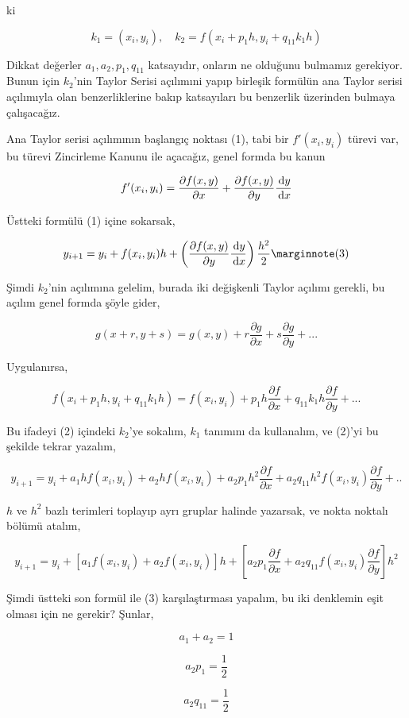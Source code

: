 \documentclass[12pt,fleqn]{article}\usepackage{../../common}
\begin{document}
ki

$$
k_1 = (x_i,y_i), \quad k_2 = f(x_i+p_1 h, y_i + q_{11}k_1h)
$$

Dikkat değerler $a_1,a_2,p_1,q_{11}$ katsayıdır, onların ne olduğunu bulmamız
gerekiyor. Bunun için $k_2$'nin Taylor Serisi açılımıni yapıp birleşik formülün
ana Taylor serisi açılımıyla olan benzerliklerine bakıp katsayıları bu benzerlik
üzerinden bulmaya çalışacağız.

Ana Taylor serisi açılımının başlangıç noktası (1), tabi bir $f'(x_i,y_i)$
türevi var, bu türevi Zincirleme Kanunu ile açacağız, genel formda bu kanun

$$
f'(x_i,y_i) = \frac{\partial f(x,y)}{\partial x} +
\frac{\partial f(x,y)}{\partial y} \frac{\,\mathrm{d} y}{\,\mathrm{d} x}
$$

Üstteki formülü (1) içine sokarsak,

$$
y_{i+1} = y_i + f(x_i,y_i) h +
\left( \frac{\partial f(x,y)}{\partial y} \frac{\ud y}{\ud x}  \right) \frac{h^2}{2}
\mlabel{3}
$$

Şimdi $k_2$'nin açılımına gelelim, burada iki değişkenli Taylor açılımı gerekli,
bu açılım genel formda şöyle gider,

$$
g(x+r,y+s) = g(x,y) + r \frac{\partial g}{\partial x} + s \frac{\partial g}{\partial y} + ...
$$

Uygulanırsa,

$$
f(x_i+p_1 h, y_i + q_{11}k_1h) = f(x_i,y_i) +
p_1 h \frac{\partial f}{\partial x} +
q_{11} k_1 h \frac{\partial f}{\partial y} + ...
$$

Bu ifadeyi (2) içindeki $k_2$'ye sokalım, $k_1$ tanımını da kullanalım, ve
(2)'yi bu şekilde tekrar yazalım,

$$
y_{i+1} = y_i + a_1 h f(x_i,y_i) + a_2 h f(x_i,y_i) +
a_2 p_1 h^2 \frac{\partial f}{\partial x} +
a_2 q_{11} h^2 f(x_i,y_i) \frac{\partial f}{\partial y} + ..
$$

$h$ ve $h^2$ bazlı terimleri toplayıp ayrı gruplar halinde yazarsak, ve
nokta noktalı bölümü atalım,

$$
y_{i+1} = y_i + [a_1 f(x_i,y_i) + a_2 f(x_i,y_i)] h +
\left[a_2 p_1 \frac{\partial f}{\partial x} +
 a_2 q_{11} f(x_i,y_i) \frac{\partial f}{\partial y}
\right] h^2
$$

Şimdi üstteki son formül ile (3) karşılaştırması yapalım, bu iki denklemin eşit
olması için ne gerekir? Şunlar,

$$
a_1 + a_2 = 1
$$

$$
a_2 p_1 = \frac{1}{2}
$$

$$
a_2 q_{11} = \frac{1}{2}
$$
\end{document}
